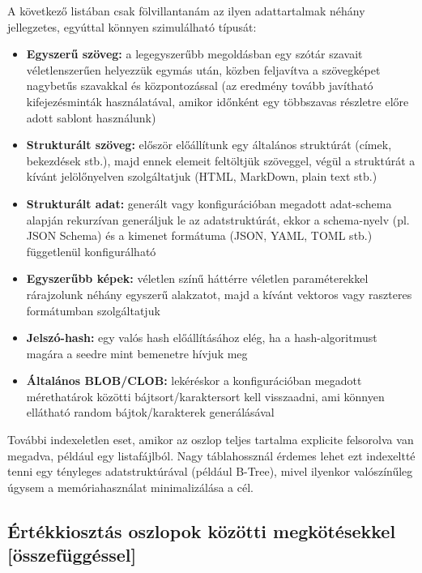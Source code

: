 \documentclass[
    parspace,
    noindent,
    nohyp,
]{elteiktdk}[2023/04/10]
\begin{document}
A következő listában csak fölvillantanám az ilyen adattartalmak néhány jellegzetes,
egyúttal könnyen szimulálható típusát:

\begin{itemize}
  \item \textbf{Egyszerű szöveg:}
    a legegyszerűbb megoldásban egy szótár szavait véletlenszerűen helyezzük egymás után,
    közben feljavítva a szövegképet nagybetűs szavakkal és központozással
    (az eredmény tovább javítható kifejezésminták használatával,
    amikor időnként egy többszavas részletre előre adott sablont használunk)
  \item \textbf{Strukturált szöveg:}
    először előállítunk egy általános struktúrát (címek, bekezdések stb.),
    majd ennek elemeit feltöltjük szöveggel,
    végül a struktúrát a kívánt jelölőnyelven szolgáltatjuk (HTML, MarkDown, plain text stb.)
  \item \textbf{Strukturált adat:}
    generált vagy konfigurációban megadott adat-schema alapján rekurzívan generáljuk le az adatstruktúrát,
    ekkor a schema-nyelv (pl. JSON Schema) és a kimenet formátuma (JSON, YAML, TOML stb.)
    függetlenül konfigurálható
  \item \textbf{Egyszerűbb képek:}
    véletlen színű háttérre véletlen paraméterekkel
    rárajzolunk néhány egyszerű alakzatot,
    majd a kívánt vektoros vagy raszteres formátumban szolgáltatjuk
  \item \textbf{Jelszó-hash:}
    egy valós hash előállításához elég, ha a hash-algoritmust magára a seedre mint bemenetre hívjuk meg
  \item \textbf{Általános BLOB/CLOB:}
    lekéréskor a konfigurációban megadott mérethatárok közötti bájtsort/karaktersort kell visszaadni,
    ami könnyen ellátható random bájtok/karakterek generálásával
\end{itemize}

További indexeletlen eset, amikor az oszlop teljes tartalma explicite felsorolva van megadva,
például egy listafájlból.
Nagy táblahossznál érdemes lehet ezt indexeltté tenni egy tényleges adatstruktúrával (például B-Tree),
mivel ilyenkor valószínűleg úgysem a memóriahasználat minimalizálása a cél.

\subsection{Értékkiosztás oszlopok közötti megkötésekkel [összefüggéssel]}

\end{document}
